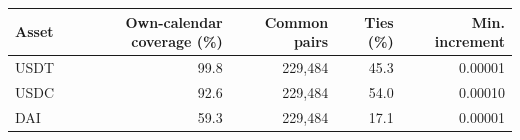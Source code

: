 \begin{tabular}{lrrrr}
\toprule
Asset & Own-calendar coverage (\%) & Common pairs & Ties (\%) & Min. increment\\
\midrule
USDT & 99.8 & 229,484 & 45.3 & 0.00001 \tabularnewline
USDC & 92.6 & 229,484 & 54.0 & 0.00010 \tabularnewline
DAI & 59.3 & 229,484 & 17.1 & 0.00001 \tabularnewline
\bottomrule
\end{tabular}
